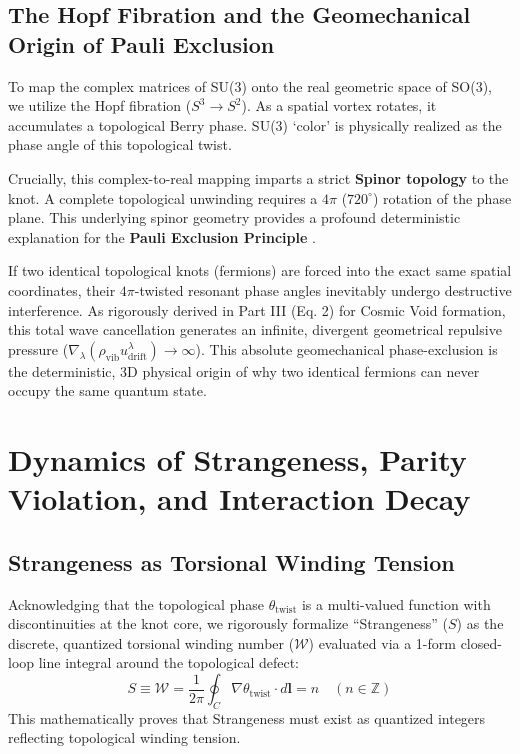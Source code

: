 \documentclass[reprint,amsmath,amssymb,aps,prd]{revtex4-2}
\begin{document}
\subsection{The Hopf Fibration and the Geomechanical Origin of Pauli Exclusion}
To map the complex matrices of SU(3) onto the real geometric space of SO(3), we utilize the Hopf fibration ($S^3 \to S^2$). As a spatial vortex rotates, it accumulates a topological Berry phase. SU(3) `color' is physically realized as the phase angle of this topological twist.

Crucially, this complex-to-real mapping imparts a strict \textbf{Spinor topology} to the knot. A complete topological unwinding requires a $4\pi$ ($720^\circ$) rotation of the phase plane. This underlying spinor geometry provides a profound deterministic explanation for the \textbf{Pauli Exclusion Principle} \cite{Pauli1925}.

If two identical topological knots (fermions) are forced into the exact same spatial coordinates, their $4\pi$-twisted resonant phase angles inevitably undergo destructive interference. As rigorously derived in Part III (Eq. 2) for Cosmic Void formation, this total wave cancellation generates an infinite, divergent geometrical repulsive pressure ($\nabla_\lambda (\rho_{\mathrm{vib}} u^\lambda_{\mathrm{drift}}) \to \infty$). This absolute geomechanical phase-exclusion is the deterministic, 3D physical origin of why two identical fermions can never occupy the same quantum state.

\section{Dynamics of Strangeness, Parity Violation, and Interaction Decay}

\subsection{Strangeness as Torsional Winding Tension}
Acknowledging that the topological phase $\theta_{\mathrm{twist}}$ is a multi-valued function with discontinuities at the knot core, we rigorously formalize ``Strangeness'' ($S$) as the discrete, quantized torsional winding number ($\mathcal{W}$) evaluated via a 1-form closed-loop line integral around the topological defect:
\begin{equation}
S \equiv \mathcal{W} = \frac{1}{2\pi} \oint_C \nabla \theta_{\mathrm{twist}} \cdot d\mathbf{l} = n \quad (n \in \mathbb{Z})
\end{equation}
This mathematically proves that Strangeness must exist as quantized integers reflecting topological winding tension.
\end{document}
